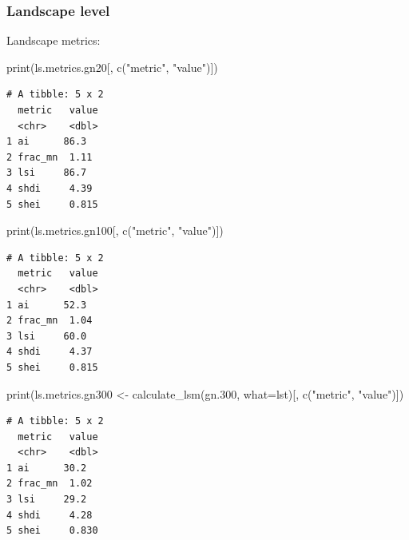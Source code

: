 \documentclass[
  letterpaper,
  DIV=11,
  numbers=noendperiod]{scrartcl}
\newenvironment{Shaded}{\begin{snugshade}}{\end{snugshade}}
\newcommand{\AttributeTok}[1]{\textcolor[rgb]{0.40,0.45,0.13}{#1}}
\newcommand{\FloatTok}[1]{\textcolor[rgb]{0.68,0.00,0.00}{#1}}
\newcommand{\FunctionTok}[1]{\textcolor[rgb]{0.28,0.35,0.67}{#1}}
\newcommand{\NormalTok}[1]{\textcolor[rgb]{0.00,0.23,0.31}{#1}}
\newcommand{\OtherTok}[1]{\textcolor[rgb]{0.00,0.23,0.31}{#1}}
\newcommand{\StringTok}[1]{\textcolor[rgb]{0.13,0.47,0.30}{#1}}
\begin{document}
\hypertarget{landscape-level-2}{%
\subsubsection{Landscape level}\label{landscape-level-2}}

Landscape metrics:

\begin{Shaded}
\begin{Highlighting}[]
\FunctionTok{print}\NormalTok{(ls.metrics.gn20[, }\FunctionTok{c}\NormalTok{(}\StringTok{"metric"}\NormalTok{, }\StringTok{"value"}\NormalTok{)])}
\end{Highlighting}
\end{Shaded}

\begin{verbatim}
# A tibble: 5 x 2
  metric   value
  <chr>    <dbl>
1 ai      86.3  
2 frac_mn  1.11 
3 lsi     86.7  
4 shdi     4.39 
5 shei     0.815
\end{verbatim}

\begin{Shaded}
\begin{Highlighting}[]
\FunctionTok{print}\NormalTok{(ls.metrics.gn100[, }\FunctionTok{c}\NormalTok{(}\StringTok{"metric"}\NormalTok{, }\StringTok{"value"}\NormalTok{)])}
\end{Highlighting}
\end{Shaded}

\begin{verbatim}
# A tibble: 5 x 2
  metric   value
  <chr>    <dbl>
1 ai      52.3  
2 frac_mn  1.04 
3 lsi     60.0  
4 shdi     4.37 
5 shei     0.815
\end{verbatim}

\begin{Shaded}
\begin{Highlighting}[]
\FunctionTok{print}\NormalTok{(ls.metrics.gn300 }\OtherTok{\textless{}{-}} \FunctionTok{calculate\_lsm}\NormalTok{(gn}\FloatTok{.300}\NormalTok{, }\AttributeTok{what=}\NormalTok{lst)[, }\FunctionTok{c}\NormalTok{(}\StringTok{"metric"}\NormalTok{, }\StringTok{"value"}\NormalTok{)])}
\end{Highlighting}
\end{Shaded}

\begin{verbatim}
# A tibble: 5 x 2
  metric   value
  <chr>    <dbl>
1 ai      30.2  
2 frac_mn  1.02 
3 lsi     29.2  
4 shdi     4.28 
5 shei     0.830
\end{verbatim}
\end{document}
